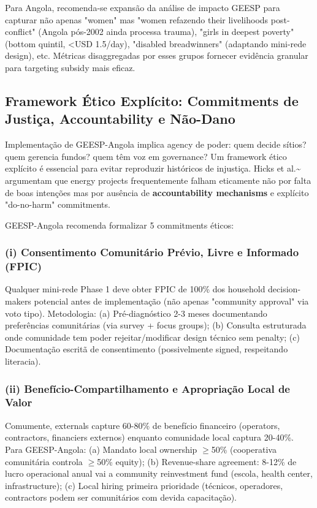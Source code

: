\documentclass[12pt, a4paper]{article}
\begin{document}
Para Angola, recomenda-se expansão da análise de impacto GEESP para capturar não apenas "women" mas "women refazendo their livelihoods post-conflict" (Angola pós-2002 ainda processa trauma), "girls in deepest poverty" (bottom quintil, <USD 1.5/day), "disabled breadwinners" (adaptando mini-rede design), etc. Métricas disaggregadas por esses grupos fornecer evidência granular para targeting subsidy mais eficaz.

\subsection{Framework Ético Explícito: Commitments de Justiça, Accountability e Não-Dano}

Implementação de GEESP-Angola implica agency de poder: quem decide sítios? quem gerencia fundos? quem têm voz em governance? Um framework ético explícito é essencial para evitar reproduzir históricos de injustiça. Hicks et al.\textasciitilde{}\citep{Hicks2025} argumentam que energy projects frequentemente falham eticamente não por falta de boas intenções mas por ausência de \textbf{accountability mechanisms} e explícito "do-no-harm" commitments.

GEESP-Angola recomenda formalizar 5 commitments éticos:

\subsubsection{(i) Consentimento Comunitário Prévio, Livre e Informado (FPIC)}
Qualquer mini-rede Phase 1 deve obter FPIC de 100\% dos household decision-makers potencial antes de implementação (não apenas "community approval" via voto tipo). Metodologia: (a) Pré-diagnóstico 2-3 meses documentando preferências comunitárias (via survey + focus groups); (b) Consulta estruturada onde comunidade tem poder rejeitar/modificar design técnico sem penalty; (c) Documentação escritã de consentimento (possivelmente signed, respeitando literacia).

\subsubsection{(ii) Benefício-Compartilhamento e Apropriação Local de Valor}
Comumente, externals capture 60-80\% de benefício financeiro (operators, contractors, financiers externos) enquanto comunidade local captura 20-40\%. Para GEESP-Angola: (a) Mandato local ownership $\geq$50\% (cooperativa comunitária controla $\geq$50\% equity); (b) Revenue-share agreement: 8-12\% de lucro operacional anual vai a community reinvestment fund (escola, health center, infrastructure); (c) Local hiring primeira prioridade (técnicos, operadores, contractors podem ser comunitários com devida capacitação).
\end{document}
